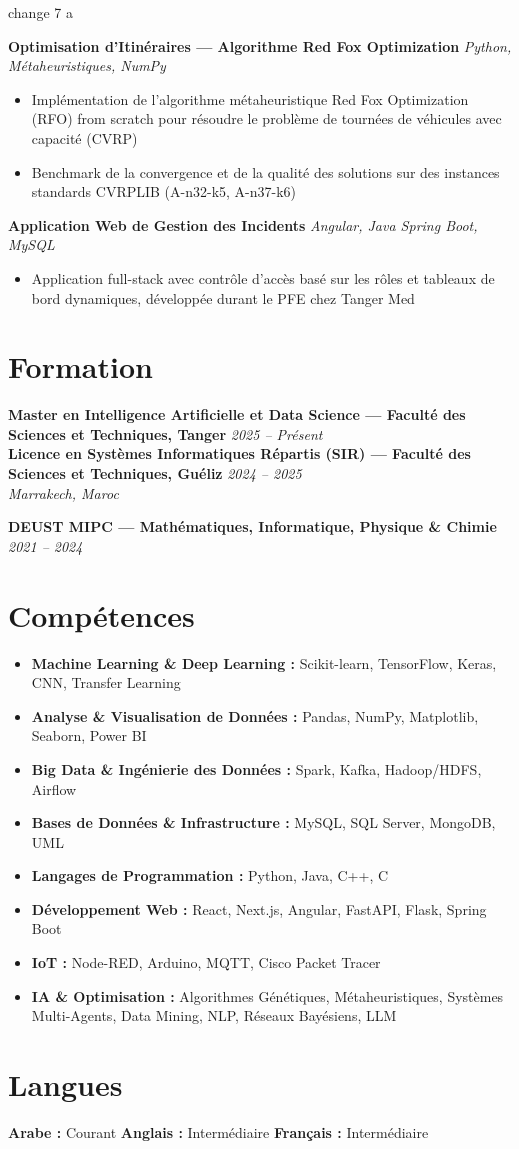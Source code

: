 change 7 a \documentclass[11pt,a4paper]{article}
\newcommand{\heading}[2]{\textbf{#1} \hfill \textit{#2}\\}
\begin{document}
\textbf{Optimisation d'Itin\'eraires --- Algorithme Red Fox Optimization} \hfill \textit{Python, M\'etaheuristiques, NumPy}
\begin{itemize}
    \item Impl\'ementation de l'algorithme m\'etaheuristique Red Fox Optimization (RFO) from scratch pour r\'esoudre le probl\`eme de tourn\'ees de v\'ehicules avec capacit\'e (CVRP)
    \item Benchmark de la convergence et de la qualit\'e des solutions sur des instances standards CVRPLIB (A-n32-k5, A-n37-k6)
\end{itemize}

\textbf{Application Web de Gestion des Incidents} \hfill \textit{Angular, Java Spring Boot, MySQL}
\begin{itemize}
    \item Application full-stack avec contr\^ole d'acc\`es bas\'e sur les r\^oles et tableaux de bord dynamiques, d\'evelopp\'ee durant le PFE chez Tanger Med
\end{itemize}

\section*{Formation}

\heading{Master en Intelligence Artificielle et Data Science --- Facult\'e des Sciences et Techniques, Tanger}{2025 -- Pr\'esent}

\heading{Licence en Syst\`emes Informatiques R\'epartis (SIR) --- Facult\'e des Sciences et Techniques, Gu\'eliz}{2024 -- 2025}
\textit{Marrakech, Maroc}

\heading{DEUST MIPC --- Math\'ematiques, Informatique, Physique \& Chimie}{2021 -- 2024}

\section*{Comp\'etences}
\begin{itemize}
    \item \textbf{Machine Learning \& Deep Learning :} Scikit-learn, TensorFlow, Keras, CNN, Transfer Learning
    \item \textbf{Analyse \& Visualisation de Donn\'ees :} Pandas, NumPy, Matplotlib, Seaborn, Power BI
    \item \textbf{Big Data \& Ing\'enierie des Donn\'ees :} Spark, Kafka, Hadoop/HDFS, Airflow
    \item \textbf{Bases de Donn\'ees \& Infrastructure :} MySQL, SQL Server, MongoDB, UML
    \item \textbf{Langages de Programmation :} Python, Java, C++, C
    \item \textbf{D\'eveloppement Web :} React, Next.js, Angular, FastAPI, Flask, Spring Boot
    \item \textbf{IoT :} Node-RED, Arduino, MQTT, Cisco Packet Tracer
    \item \textbf{IA \& Optimisation :} Algorithmes G\'en\'etiques, M\'etaheuristiques, Syst\`emes Multi-Agents, Data Mining, NLP, R\'eseaux Bay\'esiens, LLM
\end{itemize}

\section*{Langues}
\textbf{Arabe :} Courant \quad\quad \textbf{Anglais :} Interm\'ediaire \quad\quad \textbf{Fran\c{c}ais :} Interm\'ediaire
\end{document}
